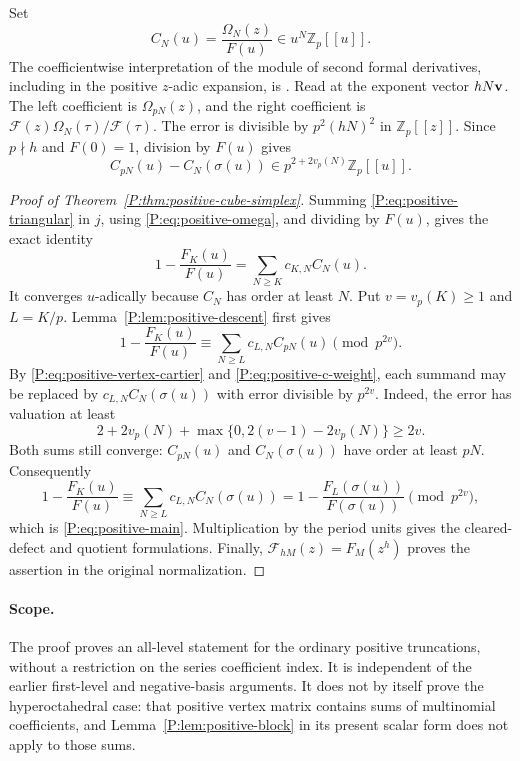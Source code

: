 \documentclass[11pt,a4paper]{article}
\theoremstyle{definition}\newtheorem{definition}[theorem]{Definition}
\theoremstyle{remark}\newtheorem{remark}[theorem]{Remark}
\numberwithin{equation}{section}
\begin{document}
Set
\[
 C_N(u)=\frac{\Omega_N(z)}{F(u)}\in u^N\mathbb Z_p[[u]].
\]
The coefficientwise interpretation of the module of second formal
derivatives, including in the positive \(z\)-adic expansion, is
\cite[Section 3, the paragraph following Corollary 3.4]{BV3}.
Read \cite[Theorem 7.3]{BV3} at the exponent vector
\(hN{\bf v}\).  The left coefficient is \(\Omega_{pN}(z)\),
and the right coefficient is
\(\mathcal F(z)\Omega_N(\tau)/\mathcal F(\tau)\).
The error is divisible by \(p^2(hN)^2\) in \(\mathbb Z_p[[z]]\).
Since \(p\nmid h\) and \(F(0)=1\), division by \(F(u)\)
gives
\begin{equation}\label{P:eq:positive-vertex-cartier}
 C_{pN}(u)-C_N(\sigma(u))
 \in p^{2+2v_p(N)}\mathbb Z_p[[u]].
\end{equation}

\begin{proof}[Proof of Theorem~\ref{P:thm:positive-cube-simplex}]
Summing \eqref{P:eq:positive-triangular} in \(j\), using
\eqref{P:eq:positive-omega}, and dividing by \(F(u)\), gives
the exact identity
\[
 1-\frac{F_K(u)}{F(u)}
 =\sum_{N\geq K}c_{K,N}C_N(u).
\]
It converges \(u\)-adically because \(C_N\) has order at
least \(N\).
Put \(v=v_p(K)\geq1\) and \(L=K/p\).
Lemma~\ref{P:lem:positive-descent} first gives
\[
 1-\frac{F_K(u)}{F(u)}
 \equiv\sum_{N\geq L}c_{L,N}C_{pN}(u)
 \pmod{p^{2v}}.
\]
By \eqref{P:eq:positive-vertex-cartier} and
\eqref{P:eq:positive-c-weight}, each summand may be replaced by
\(c_{L,N}C_N(\sigma(u))\) with error divisible by \(p^{2v}\).
Indeed, the error has valuation at least
\[
 2+2v_p(N)+\max\{0,2(v-1)-2v_p(N)\}\geq2v.
\]
Both sums still converge: \(C_{pN}(u)\) and
\(C_N(\sigma(u))\) have order at least \(pN\).
Consequently
\[
 1-\frac{F_K(u)}{F(u)}
 \equiv\sum_{N\geq L}c_{L,N}C_N(\sigma(u))
 =1-\frac{F_L(\sigma(u))}{F(\sigma(u))}
 \pmod{p^{2v}},
\]
which is \eqref{P:eq:positive-main}.
Multiplication by the period units gives the cleared-defect and
quotient formulations.  Finally,
\(\mathcal F_{hM}(z)=F_M(z^h)\) proves the assertion in the
original normalization.
\end{proof}

\paragraph{Scope.}
The proof proves an all-level statement for the ordinary positive
truncations, without a restriction on the series coefficient index.
It is independent of the earlier first-level and negative-basis
arguments.  It does not by itself prove the hyperoctahedral case:
that positive vertex matrix contains sums of multinomial
coefficients, and Lemma~\ref{P:lem:positive-block} in its present
scalar form does not apply to those sums.
\end{document}
